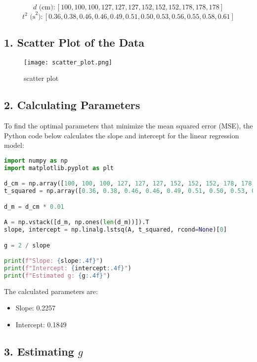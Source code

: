 \documentclass[a4paper,10pt]{article}
\begin{document}
\[
d \text{ (cm)}: [100, 100, 100, 127, 127, 127, 152, 152, 152, 178, 178, 178]
\]
\[
t^2 \text{ (s}^2\text{)}: [0.36, 0.38, 0.46, 0.46, 0.49, 0.51, 0.50, 0.53, 0.56, 0.55, 0.58, 0.61]
\]

\subsection*{1. Scatter Plot of the Data}

\begin{figure}[H]
    \centering
    \texttt{[image: scatter\_plot.png]} %
    \caption{scatter plot}
    \label{fig:scatter_plot}
\end{figure}



\subsection*{2. Calculating Parameters}

To find the optimal parameters that minimize the mean squared error (MSE), the Python code below calculates the slope and intercept for the linear regression model:

\begin{lstlisting}[language=Python, caption=Python Code for Regression Parameters]
import numpy as np
import matplotlib.pyplot as plt

d_cm = np.array([100, 100, 100, 127, 127, 127, 152, 152, 152, 178, 178, 178])
t_squared = np.array([0.36, 0.38, 0.46, 0.46, 0.49, 0.51, 0.50, 0.53, 0.56, 0.55, 0.58, 0.61])

d_m = d_cm * 0.01

A = np.vstack([d_m, np.ones(len(d_m))]).T
slope, intercept = np.linalg.lstsq(A, t_squared, rcond=None)[0]

g = 2 / slope

print(f"Slope: {slope:.4f}")
print(f"Intercept: {intercept:.4f}")
print(f"Estimated g: {g:.4f}")

\end{lstlisting}

The calculated parameters are:
\begin{itemize}
    \item Slope: 0.2257 
	\item Intercept: 0.1849 
\end{itemize}

\subsection*{3. Estimating \( g \)}
\end{document}

